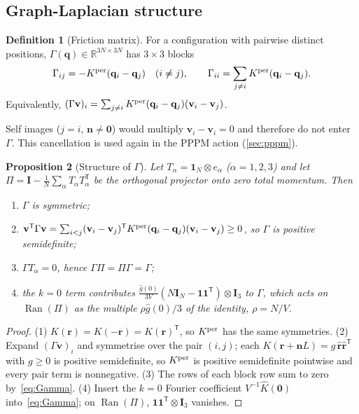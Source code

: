 \documentclass[11pt]{article}
\DeclareRobustCommand{\_}{\textunderscore\allowbreak}
\newtheorem{proposition}{Proposition}[section]
\theoremstyle{remark}
\theoremstyle{definition}
\newtheorem{definition}[proposition]{Definition}
\newcommand{\bq}{\mathbf{q}}
\newcommand{\br}{\mathbf{r}}
\newcommand{\bv}{\mathbf{v}}
\newcommand{\bn}{\mathbf{n}}
\newcommand{\rhat}{\hat{\mathbf{r}}}
\newcommand{\Id}{\mathbf{I}}
\newcommand{\one}{\mathbf{1}}
\newcommand{\R}{\mathbb{R}}
\newcommand{\Ran}{\operatorname{Ran}}
\begin{document}
\subsection{Graph-Laplacian structure}

\begin{definition}[Friction matrix]
For a configuration with pairwise distinct positions, $\Gamma(\bq)\in\R^{3N\times3N}$ has $3\times3$ blocks
\begin{equation}\label{eq:Gamma}
\Gamma_{ij}=-K^{\rm per}(\bq_i-\bq_j)\quad(i\neq j),\qquad \Gamma_{ii}=\sum_{j\neq i}K^{\rm per}(\bq_i-\bq_j).
\end{equation}
Equivalently, $(\Gamma\bv)_i=\sum_{j\neq i}K^{\rm per}(\bq_i-\bq_j)(\bv_i-\bv_j)$.
\end{definition}
Self images ($j=i$, $\bn\neq\mathbf 0$) would multiply $\bv_i-\bv_i=0$ and therefore do not enter $\Gamma$. This
cancellation is used again in the PPPM action (\cref{sec:pppm}).

\begin{proposition}[Structure of $\Gamma$]\label{prop:structure}
Let $T_\alpha=\one_N\otimes e_\alpha$ ($\alpha=1,2,3$) and let $\Pi=\Id-\frac1N\sum_\alpha T_\alpha T_\alpha^{\mathsf T}$
be the orthogonal projector onto zero total momentum. Then
\begin{enumerate}
\item $\Gamma$ is symmetric;
\item $\bv^{\mathsf T}\Gamma\bv=\sum_{i<j}(\bv_i-\bv_j)^{\mathsf T}K^{\rm per}(\bq_i-\bq_j)(\bv_i-\bv_j)\ge0$, so
$\Gamma$ is positive semidefinite;
\item $\Gamma T_\alpha=0$, hence $\Gamma\Pi=\Pi\Gamma=\Gamma$;
\item the $k=0$ term contributes $\frac{\hat g(0)}{3V}(N\Id_N-\one\one^{\mathsf T})\otimes\Id_3$ to $\Gamma$,
which acts on $\Ran(\Pi)$ as the multiple $\rho\hat g(0)/3$ of the identity, $\rho=N/V$.
\end{enumerate}
\end{proposition}
\begin{proof}
(1) $K(\br)=K(-\br)=K(\br)^{\mathsf T}$, so $K^{\rm per}$ has the same symmetries. (2) Expand
$(\Gamma\bv)_i$ and symmetrise over the pair $(i,j)$; each $K(\br+\bn L)=g\,\rhat\rhat^{\mathsf T}$ with $g\ge0$
is positive semidefinite, so $K^{\rm per}$ is positive semidefinite pointwise and every pair term is nonnegative.
(3) The rows of each block row sum to zero by~\eqref{eq:Gamma}. (4) Insert the $k=0$ Fourier coefficient
$V^{-1}\hat K(\mathbf 0)$ into~\eqref{eq:Gamma}; on $\Ran(\Pi)$, $\one\one^{\mathsf T}\otimes\Id_3$ vanishes.
\end{proof}
\end{document}
